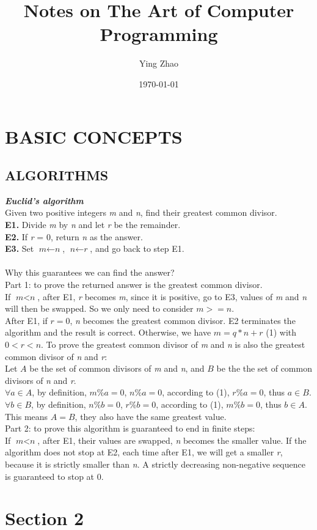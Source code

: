 \documentclass[11pt]{article}
\title{Notes on The Art of Computer Programming}
\author{ Ying Zhao }
\date{\today}
\begin{document}
\maketitle	
\pagebreak



\section{BASIC CONCEPTS}
\subsection{ALGORITHMS}
\textbf{\textit{Euclid's algorithm}}\\
Given two positive integers \textit{m} and \textit{n}, find their greatest common divisor.\\
\textbf{E1.} Divide \textit{m} by \textit{n} and let \textit{r} be the remainder.\\
\textbf{E2.} If \textit{r} = 0, return \textit{n} as the answer.\\
\textbf{E3.} Set $\textit{m} \leftarrow \textit{n}$, $\textit{n} \leftarrow \textit{r}$,  and go back to step E1.\\
\\
Why this guarantees we can find the answer?\\
Part 1: to prove the returned answer is the greatest common divisor.\\
If $\textit{m} < \textit{n}$, after E1, \textit{r} becomes \textit{m}, since it is positive, go to E3, values of \textit{m} and \textit{n} will then be swapped. So we only need to consider $\textit{m} >= \textit{n}$.\\
After E1, if $\textit{r} = 0$, \textit{n} becomes the greatest common divisor. E2 terminates the algorithm and the result is correct. Otherwise, we have $\textit{m} = q*n + r$ (1) with $0<r<n$. To prove the greatest common divisor of \textit{m} and \textit{n} is also the greatest common divisor of \textit{n} and \textit{r}:\\
Let $A$ be the set of common divisors of \textit{m} and \textit{n}, and $B$ be the the set of common divisors of \textit{n} and \textit{r}.\\
$\forall a \in A$, by definition, $m\%a = 0$, $n\%a = 0$, according to (1), $r\%a = 0$, thus $a \in B$.\\
$\forall b \in B$, by definition, $n\%b = 0$, $r\%b = 0$, according to (1), $m\%b = 0$, thus $b \in A$.\\
This means $A = B$, they also have the same greatest value.\\
Part 2: to prove this algorithm is guaranteed to end in finite steps:\\
If $\textit{m} < \textit{n}$, after E1, their values are swapped, \textit{n} becomes the smaller value. If the algorithm does not stop at E2, each time after E1, we will get a smaller \textit{r}, because it is strictly smaller than \textit{n}. A strictly decreasing non-negative sequence is guaranteed to stop at 0.\blacksquare
\pagebreak
\section{Section 2}

\end{document}
